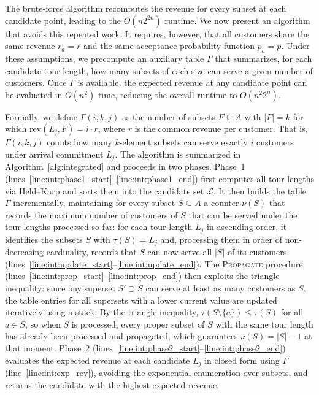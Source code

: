 \documentclass[11pt]{article}
\theoremstyle{plain}
\theoremstyle{definition}
\begin{document}
	The brute-force algorithm recomputes the revenue for every subset at each candidate point, leading to the $O(n 2^{2n})$ runtime. We now present an algorithm that avoids this repeated work. It requires, however, that all customers share the same revenue $r_a = r$ and the same acceptance probability function $p_a = p$. Under these assumptions, we precompute an auxiliary table $\Gamma$ that summarizes, for each candidate tour length, how many subsets of each size can serve a given number of customers. Once $\Gamma$ is available, the expected revenue at any candidate point can be evaluated in $O(n^2)$ time, reducing the overall runtime to $O(n^2 2^n)$.
	
	Formally, we define $\Gamma(i, k, j)$ as the number of subsets $F \subseteq A$ with $|F| = k$ for which $\text{rev}(L_j, F) = i \cdot r$, where $r$ is the common revenue per customer. That is, $\Gamma(i, k, j)$ counts how many $k$-element subsets can serve exactly $i$ customers under arrival commitment $L_j$. The algorithm is summarized in Algorithm~\ref{alg:integrated} and proceeds in two phases. Phase~1 (lines~\ref{line:int:phase1_start}--\ref{line:int:phase1_end}) first computes all tour lengths via Held--Karp and sorts them into the candidate set $\mathcal{L}$. It then builds the table $\Gamma$ incrementally, maintaining for every subset $S \subseteq A$ a counter $\nu(S)$ that records the maximum number of customers of $S$ that can be served under the tour lengths processed so far: for each tour length $L_j$ in ascending order, it identifies the subsets $S$ with $\tau(S) = L_j$ and, processing them in order of non-decreasing cardinality, records that $S$ can now serve all $|S|$ of its customers (lines~\ref{line:int:update_start}--\ref{line:int:update_end}). The \textsc{Propagate} procedure (lines~\ref{line:int:prop_start}--\ref{line:int:prop_end}) then exploits the triangle inequality: since any superset $S' \supset S$ can serve at least as many customers as $S$, the table entries for all supersets with a lower current value are updated iteratively using a stack. By the triangle inequality, $\tau(S \setminus \{a\}) \leq \tau(S)$ for all $a \in S$, so when $S$ is processed, every proper subset of $S$ with the same tour length has already been processed and propagated, which guarantees $\nu(S) = |S| - 1$ at that moment. Phase~2 (lines~\ref{line:int:phase2_start}--\ref{line:int:phase2_end}) evaluates the expected revenue at each candidate $L_j$ in closed form using $\Gamma$ (line~\ref{line:int:exp_rev}), avoiding the exponential enumeration over subsets, and returns the candidate with the highest expected revenue.
	
\end{document}
